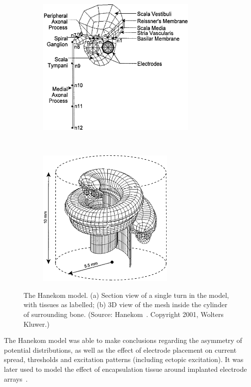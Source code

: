 \begin{figure}
	\centering

	\begin{subfigure}[t]{0.51\textwidth}
        \centering
        \includegraphics[height=6.8cm]{Background/hanekom_section}
        \caption{ }
        \label{fig:hanekom_section}
    \end{subfigure}%
    ~~
    \begin{subfigure}[t]{0.44\textwidth}
        \centering
        \includegraphics[height=6.8cm]{Background/hanekom_mesh}
        \caption{ }
        \label{fig:hanekom_mesh}
    \end{subfigure}%

	\caption[The Hanekom model]{The Hanekom model. (a) Section view of a single
	turn in the model, with tissues as labelled; (b) 3D view of the mesh inside
	the cylinder of surrounding bone. (Source: Hanekom~\cite{hanekom2001}. Copyright
	\textcopyright{} 2001, Wolters Kluwer.)}
	\label{fig:model_hanekom}
\end{figure}

The Hanekom model was able to make conclusions regarding the asymmetry of
potential distributions, as well as the effect of electrode placement on current
spread, thresholds and excitation patterns (including ectopic excitation). It
was later used to model the effect of encapsulation tissue around implanted
electrode arrays~\cite{hanekom2005}.

